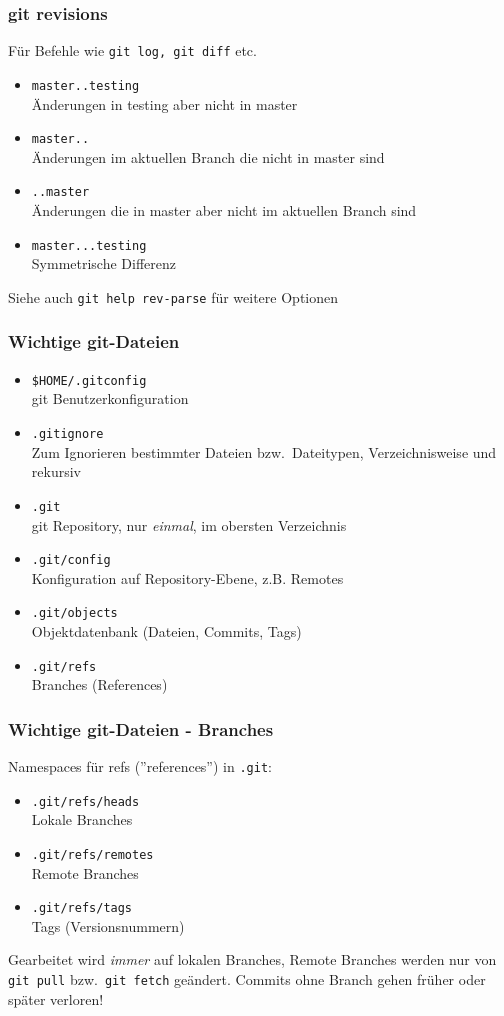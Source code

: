 \begin{frame}
  \frametitle{git revisions}
  \small Für Befehle wie {\tt git log, git diff} etc.
  \begin{itemize}
    \item {\tt master..testing} \\ Änderungen in testing aber nicht in master
    \item {\tt master..} \\ Änderungen im aktuellen Branch die nicht in master sind
    \item {\tt ..master} \\ Änderungen die in master aber nicht im aktuellen Branch sind
    \item {\tt master...testing} \\ Symmetrische Differenz
  \end{itemize}
  Siehe auch {\tt git help rev-parse} für weitere Optionen
\end{frame}


\begin{frame}
  \frametitle{Wichtige git-Dateien}
  \begin{itemize}
    \item {\tt \$HOME/.gitconfig} \\ git Benutzerkonfiguration 
    \item {\tt .gitignore} \\ Zum Ignorieren bestimmter Dateien bzw.\ Dateitypen, Verzeichnisweise und rekursiv
    \item {\tt .git} \\ git Repository, nur \emph{einmal}, im obersten Verzeichnis
    \item {\tt .git/config} \\ Konfiguration auf Repository-Ebene, z.B. Remotes
    \item {\tt .git/objects} \\ Objektdatenbank (Dateien, Commits, Tags)
    \item {\tt .git/refs} \\ Branches (References)
  \end{itemize}
\end{frame}

\begin{frame}
  \frametitle{Wichtige git-Dateien - Branches}
  Namespaces für refs (''references'') in {\tt .git}:
  \begin{itemize}
    \item {\tt .git/refs/heads} \\ Lokale Branches
    \item {\tt .git/refs/remotes} \\ Remote Branches
    \item {\tt .git/refs/tags} \\ Tags (Versionsnummern)
  \end{itemize}
  Gearbeitet wird \emph{immer} auf lokalen Branches, Remote Branches werden nur von {\tt git pull} bzw.\ {\tt git fetch} geändert. Commits ohne Branch gehen früher oder später verloren!
\end{frame}

